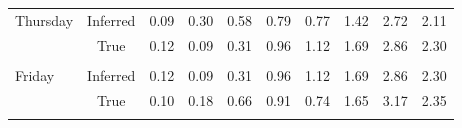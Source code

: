 \begin{table}[H]
\begin{tabular}{lccccccccc}
\multicolumn{1}{l|}{\multirow{2}{*}{Thursday}}  & \multicolumn{1}{c|}{Inferred} & \multicolumn{1}{c|}{0.09}           & \multicolumn{1}{c|}{0.30}           & \multicolumn{1}{c|}{0.58}           & \multicolumn{1}{c|}{0.79}           & \multicolumn{1}{c|}{0.77}           & \multicolumn{1}{c|}{1.42}           & \multicolumn{1}{c|}{2.72}           & \multicolumn{1}{c|}{2.11}           \\ \cline{2-10} 
\multicolumn{1}{l|}{}                           & \multicolumn{1}{c|}{True}     & \multicolumn{1}{c|}{0.12}           & \multicolumn{1}{c|}{0.09}           & \multicolumn{1}{c|}{0.31}           & \multicolumn{1}{c|}{0.96}           & \multicolumn{1}{c|}{1.12}           & \multicolumn{1}{c|}{1.69}           & \multicolumn{1}{c|}{2.86}           & \multicolumn{1}{c|}{2.30}           \\ \cline{2-10} 
                                                &                               &                                     &                                     &                                     &                                     &                                     &                                     &                                     &                                     \\ \cline{2-10} 
\multicolumn{1}{l|}{\multirow{2}{*}{Friday}}    & \multicolumn{1}{c|}{Inferred} & \multicolumn{1}{c|}{0.12}           & \multicolumn{1}{c|}{0.09}           & \multicolumn{1}{c|}{0.31}           & \multicolumn{1}{c|}{0.96}           & \multicolumn{1}{c|}{1.12}           & \multicolumn{1}{c|}{1.69}           & \multicolumn{1}{c|}{2.86}           & \multicolumn{1}{c|}{2.30}           \\ \cline{2-10} 
\multicolumn{1}{l|}{}                           & \multicolumn{1}{c|}{True}     & \multicolumn{1}{c|}{0.10}           & \multicolumn{1}{c|}{0.18}           & \multicolumn{1}{c|}{0.66}           & \multicolumn{1}{c|}{0.91}           & \multicolumn{1}{c|}{0.74}           & \multicolumn{1}{c|}{1.65}           & \multicolumn{1}{c|}{3.17}           & \multicolumn{1}{c|}{2.35}           \\ \cline{2-10} 
                                                &                               &                                     &                                     &                                     &                                     &                                     &                                     &                                     &                                     \\ \cline{2-10} 

\end{tabular}
\end{table}
